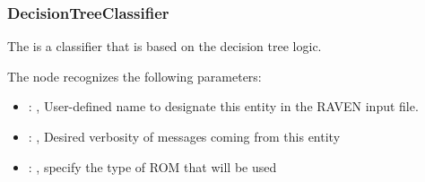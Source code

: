 \subsubsection{DecisionTreeClassifier}
  The  is a classifier that is based on the
  decision tree logic.                          

  The  node recognizes the following parameters:
    \begin{itemize}
      \item {}: ,
        User-defined name to designate this entity in the RAVEN input file.
      \item {}: ,
        Desired verbosity of messages coming from this entity
      \item {}: ,
        specify the type of ROM that will be used
  \end{itemize}


